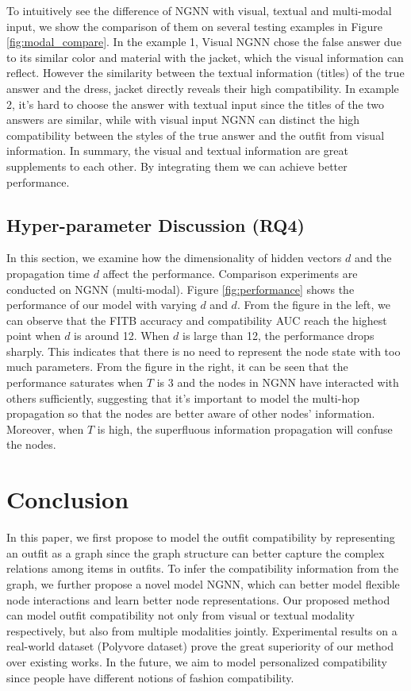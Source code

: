 \documentclass[sigconf]{acmart}
\begin{document}
To intuitively see the difference of NGNN with visual, textual and multi-modal input, we show the comparison of them on several testing examples in Figure \ref{fig:modal_compare}.
In the example 1, Visual NGNN chose the false answer due to its similar color and material with the jacket, which the visual information can reflect. However the similarity between the textual information (titles) of the true answer and the dress, jacket directly reveals their high compatibility.
In example 2, it's hard to choose the answer with textual input since the titles of the two answers are similar, while with visual input  NGNN can distinct the high compatibility between the styles of the true answer and the outfit from visual information.
In summary, the visual and textual information are great supplements to each other. By integrating them we can achieve better performance.



\subsection{Hyper-parameter Discussion (RQ4)}


In this section, we examine how the dimensionality of hidden vectors $d$ and the propagation time $d$ affect the performance. Comparison experiments are conducted on NGNN (multi-modal).
Figure \ref{fig:performance} shows the performance of our model with varying $d$ and $d$.
From the figure in the left, we can observe that the FITB accuracy and compatibility AUC reach the highest point when $d$ is around 12. When $d$ is large than 12, the performance drops sharply. This indicates that there is no need to represent the node state with too much parameters.
From the figure in the right, it can be seen that the performance saturates when $T$ is $3$ and the nodes in NGNN have interacted with others sufficiently, suggesting that it's important to model the multi-hop propagation so that the nodes are better aware of other nodes' information. Moreover, when $T$ is high, the superfluous information propagation will confuse the nodes.





\section{Conclusion}
In this paper, we first propose to model the outfit compatibility by representing an outfit as a graph since the graph structure can better capture the complex relations among items in outfits.
To infer the compatibility information from the graph, we further propose a novel model NGNN, which can better model flexible node interactions and learn better node representations.
Our proposed method can model outfit compatibility not only from visual or textual modality respectively, but also from multiple modalities jointly.
Experimental results on a real-world dataset (Polyvore dataset) prove the great superiority of our method over existing works.
In the future, we aim to model personalized compatibility since people have different notions of fashion compatibility.
\end{document}
